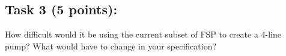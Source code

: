 \documentclass{article}
\newcommand{\head}{\subsection*}
\begin{document}
\head{Task 3 (5 points):}


How difficult would it be using the current subset of FSP to create
a 4-line pump? What would have to change in your specification?
\end{document}
